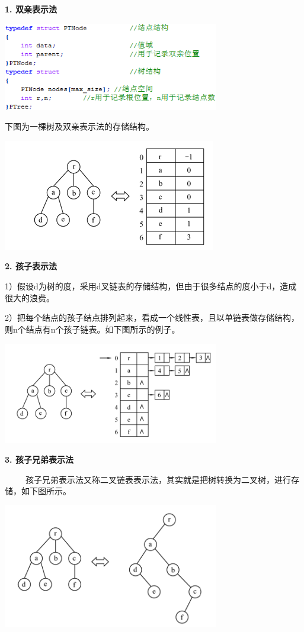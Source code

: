 {\textbf{1. 双亲表示法}}{}

\includegraphics[width=3.70833in,height=1.52083in]{png-jpeg-pics/4836DA8387A9B72CC5286F7A0ADCE5C4.png}

{下图为一棵树及双亲表示法的存储结构。\\
}

\includegraphics[width=3.65625in,height=1.91667in]{png-jpeg-pics/07F6C48018B2828EBF2C3AE203EC4184.png}

{\textbf{2. 孩子表示法}}

{1）假设d为树的度，采用d叉链表的存储结构，但由于很多结点的度小于d，造成很大的浪费。}

{2）把每个结点的孩子结点排列起来，看成一个线性表，且以单链表做存储结构，则n个结点有n个孩子链表。如下图所示的例子。}

\includegraphics[width=3.70833in,height=1.75000in]{png-jpeg-pics/899A3EB24E8B87B9EC2551F99D4AF3C4.png}

{\textbf{3. 孩子兄弟表示法}}

{~ ~ ~
孩子兄弟表示法又称二叉链表表示法，其实就是把树转换为二叉树，进行存储，如下图所示。}

\includegraphics[width=3.70833in,height=2.14583in]{png-jpeg-pics/5658702D90DC100F532749204A4F84F3.png}
